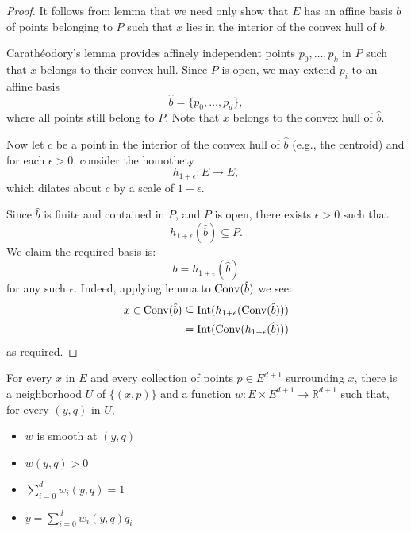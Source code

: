 \begin{proof}
  \leanok
  It follows from lemma  that we need only show that $E$
  has an affine basis $b$ of points belonging to $P$ such that $x$ lies in
  the interior of the convex hull of $b$.

  Carathéodory's lemma  provides affinely independent
  points $p_0, \dots, p_k$ in $P$ such that $x$ belongs to their convex
  hull. Since $P$ is open, we may extend $p_i$ to an affine basis
  \[
    \hat b = \{p_0, \ldots, p_d\},
  \]
  where all points still belong to $P$.
  Note that $x$ belongs to the convex hull of $\hat b$.

  Now let $c$ be a point in the interior of the convex hull of $\hat b$
  (e.g., the centroid) and for each $\epsilon > 0$, consider the homothety
  \[
    h_{1+\epsilon} : E \to E,
  \]
  which dilates about $c$ by a scale of $1 + \epsilon$.

  Since $\hat b$ is finite and contained in $P$, and $P$ is open, there exists
  $\epsilon > 0$ such that
  \[
    h_{1+\epsilon} (\hat b) \subseteq P.
  \]
  We claim the required basis is:
  \[
    b = h_{1+\epsilon} (\hat b)
  \]
  for any such $\epsilon$. Indeed, applying
  lemma  to $\operatorname{Conv}(\hat b)$ we see:
  \begin{align*}
    x \in \operatorname{Conv}(\hat b) &\subseteq \operatorname{Int} (h_{1+\epsilon} (\operatorname{Conv}(\hat b)))\\
                  &= \operatorname{Int} (\operatorname{Conv}(h_{1+\epsilon} (\hat b)))
  \end{align*}
  as required.
\end{proof}


\begin{lemma}
  \label{lem:smooth_barycentric_coord}
  \leanok
  For every $x$ in $E$ and every collection of points $p ∈ E^{d+1}$
  surrounding $x$, there is a neighborhood $U$ of $\{(x, p)\}$
  and a function $w : E × E^{d+1} → ℝ^{d+1}$ such that, for every
  $(y, q)$ in $U$,
  \begin{itemize}
    \item
      $w$ is smooth at $(y, q)$
    \item
      $w(y, q) > 0$
    \item
      $\sum_{i=0}^d w_i(y, q) = 1$
    \item
      $y = \sum_{i=0}^d w_i(y, q)q_i$
  \end{itemize}
\end{lemma}

